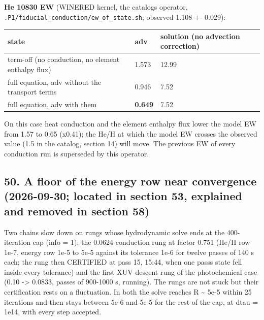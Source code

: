 \documentclass[english,a4paper]{my_memo}
\begin{document}
\textbf{He 10830 EW} (WINERED kernel, the catalog\textquotesingle s operator,
\texttt{.P1/fiducial\_conduction/ew\_of\_state.sh}; observed 1.108 +- 0.029):

{\def\LTcaptype{none} %
{\small
\begin{longtable}[]{@{}lll@{}}
\toprule\noalign{}
state & adv & solution (no advection correction) \\
\midrule\noalign{}
\endhead
\bottomrule\noalign{}
\endlastfoot
term-off (no conduction, no element enthalpy flux) & 1.573 & 12.99 \\
full equation, adv without the transport terms & 0.946 & 7.52 \\
full equation, adv with them & \textbf{0.649} & 7.52 \\
\end{longtable}
}
}

On this case heat conduction and the element enthalpy flux lower the model
EW from 1.57 to 0.65 (x0.41); the He/H at which the model EW crosses the
observed value (1.5 in the catalog, section 14) will move. The previous EW
of every conduction run is superseded by this operator.

\subsection{50. A floor of the energy row near convergence (2026-09-30; located in section 53, explained and removed in section 58)}\label{50-a-floor-of-the-energy-row-near-convergence-2026-09-30-located-in-section-53-explained-and-removed-in-section-58}

Two chains slow down on rungs whose hydrodynamic solve ends at the
400-iteration cap (info = 1): the 0.0624 conduction rung at factor 0.751
(He/H row 1e-7, energy row 1e-5 to 5e-5 against its tolerance 1e-6 for
twelve passes of 140 s each; the rung then CERTIFIED at pass 15, 15:44, when
one pass\textquotesingle s state fell inside every tolerance) and the first XUV descent rung
of the photochemical case (0.10 -\textgreater{} 0.0833, passes of 900-1000 s, running).
The rungs are not stuck but their certification rests on a fluctuation. In both the solve reaches \textbar\textbar R\textbar\textbar{} \textasciitilde{} 5e-5 within
25 iterations and then stays between 5e-6 and 5e-5 for the rest of the cap,
at dtau = 1e14, with every step accepted.
\end{document}

